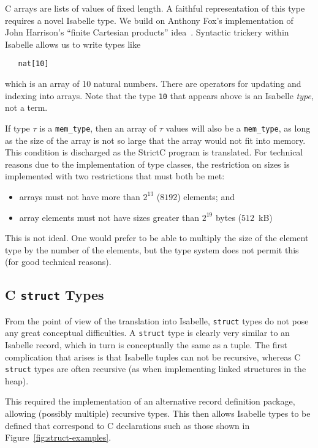 \documentclass{article}
\newcommand{\strictc}{\textsf{StrictC}}
\begin{document}
C arrays are lists of values of fixed length.  A faithful
representation of this type requires a novel Isabelle type.  We build
on Anthony Fox's implementation of John Harrison's ``finite Cartesian
products'' idea~\cite{Harrison:TPHOLs2005:Euclidean-Space}.  Syntactic
trickery within Isabelle allows us to write types like
\begin{verbatim}
   nat[10]
\end{verbatim}
which is an array of 10 natural numbers.  There are operators for
updating and indexing into arrays.  Note that the type \texttt{10}
that appears above is an Isabelle \emph{type}, not a term.

If type $\tau$ is a \texttt{mem_type}, then an array of $\tau$ values
will also be a \texttt{mem_type}, as long as the size of the array is
not so large that the array would not fit into memory.  This condition
is discharged as the \strictc{} program is translated.  For technical
reasons due to the implementation of type classes, the restriction on
sizes is implemented with two restrictions that must both be met:
\begin{itemize}
\item arrays must not have more than $2^{13}$ ($8192$) elements; and
\item array elements must not have sizes greater than $2^{19}$ bytes ($512$~kB)
\end{itemize}
This is not ideal.
One would prefer to be able to multiply the size of the element type by the number of the elements, but the type system does not permit this (for good technical reasons).

\subsection{C \texttt{struct} Types}
\label{sec:structs}

From the point of view of the translation into Isabelle,
\texttt{struct} types do not pose any great conceptual difficulties.
A \texttt{struct} type is clearly very similar to an Isabelle record,
which in turn is conceptually the same as a tuple.  The first
complication that arises is that Isabelle tuples can not be recursive,
whereas C \texttt{struct} types are often recursive (as when
implementing linked structures in the heap).

This required the implementation of an alternative record definition
package, allowing (possibly multiple) recursive types.  This then
allows Isabelle types to be defined that correspond to C declarations
such as those shown in Figure~\ref{fig:struct-examples}.
\end{document}
